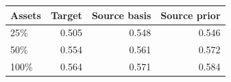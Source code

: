\begin{tabular*}{\linewidth}{@{\extracolsep{\fill}}lrrr@{}}
\toprule
Assets & Target & Source basis & Source prior \\
\midrule
25\% & 0.505 & 0.548 & 0.546 \\
50\% & 0.554 & 0.561 & 0.572 \\
100\% & 0.564 & 0.571 & 0.584 \\
\bottomrule
\end{tabular*}